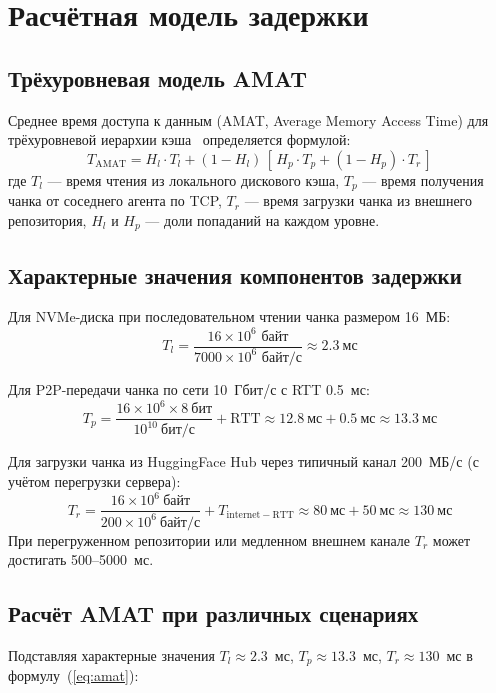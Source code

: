 \section{Расчётная модель задержки}

\subsection*{Трёхуровневая модель AMAT}

Среднее время доступа к данным (AMAT, Average Memory Access Time) для трёхуровневой иерархии кэша~\cite{hennessy2011ca} определяется формулой:
\begin{equation}
  T_{\mathrm{AMAT}} = H_l \cdot T_l + (1 - H_l)\,[\,H_p \cdot T_p + (1 - H_p) \cdot T_r\,]
  \label{eq:amat}
\end{equation}
где $T_l$ --- время чтения из локального дискового кэша, $T_p$ --- время получения чанка от соседнего агента по TCP, $T_r$ --- время загрузки чанка из внешнего репозитория, $H_l$ и $H_p$ --- доли попаданий на каждом уровне.

\subsection*{Характерные значения компонентов задержки}

Для NVMe-диска при последовательном чтении чанка размером 16~МБ:
\[
  T_l = \frac{16 \times 10^6 \text{ байт}}{7000 \times 10^6 \text{ байт/с}} \approx 2.3~\text{мс}
\]

Для P2P-передачи чанка по сети 10~Гбит/с с RTT 0.5~мс:
\[
  T_p = \frac{16 \times 10^6 \times 8~\text{бит}}{10^{10}~\text{бит/с}} + \mathrm{RTT} \approx 12.8~\text{мс} + 0.5~\text{мс} \approx 13.3~\text{мс}
\]

Для загрузки чанка из HuggingFace Hub через типичный канал 200~МБ/с (с учётом перегрузки сервера):
\[
  T_r = \frac{16 \times 10^6~\text{байт}}{200 \times 10^6~\text{байт/с}} + T_{\mathrm{internet-RTT}} \approx 80~\text{мс} + 50~\text{мс} \approx 130~\text{мс}
\]
При перегруженном репозитории или медленном внешнем канале $T_r$ может достигать 500--5000~мс.

\subsection*{Расчёт AMAT при различных сценариях}

Подставляя характерные значения $T_l \approx 2.3$~мс, $T_p \approx 13.3$~мс, $T_r \approx 130$~мс в формулу~(\ref{eq:amat}):

